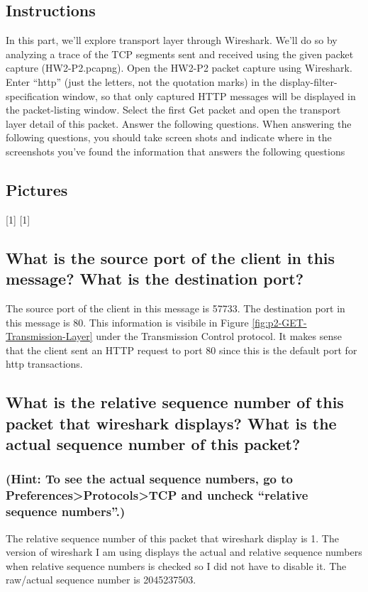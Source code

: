 \documentclass{assignment-x}
\begin{document}
\subsection{Instructions}
In this part, we'll explore transport layer through Wireshark. We'll do so by analyzing a trace of
the TCP segments sent and received using the given packet capture (HW2-P2.pcapng).
Open the HW2-P2 packet capture using Wireshark.
Enter “http” (just the letters, not the quotation marks) in the display-filter-specification
window, so that only captured HTTP messages will be displayed in the packet-listing
window.
Select the first Get packet and open the transport layer detail of this packet.
Answer the following questions. When answering the following questions, you should take
screen shots and indicate where in the screenshots you've found the information that
answers the following questions

\subsection{Pictures}
[1\linewidth]
[1\linewidth]

\subsection{What is the source port of the client in this message? What is the destination port?}
The source port of the client in this message is 57733. The destination port in this message is 80. This information is visibile in Figure \ref{fig:p2-GET-Transmission-Layer} under the Transmission Control protocol. It makes sense that the client sent an HTTP request to port 80 since this is the default port for http transactions.

\subsection{What is the relative sequence number of this packet that wireshark displays? What is the
actual sequence number of this packet? }
\subsubsection{(Hint: To see the actual sequence numbers, go to Preferences>Protocols>TCP and uncheck “relative sequence numbers”.)}
The relative sequence number of this packet that wireshark display is 1. The version of wireshark I am using displays the actual and relative sequence numbers when relative sequence numbers is checked so I did not have to disable it. The raw/actual sequence number is 2045237503.
\end{document}
